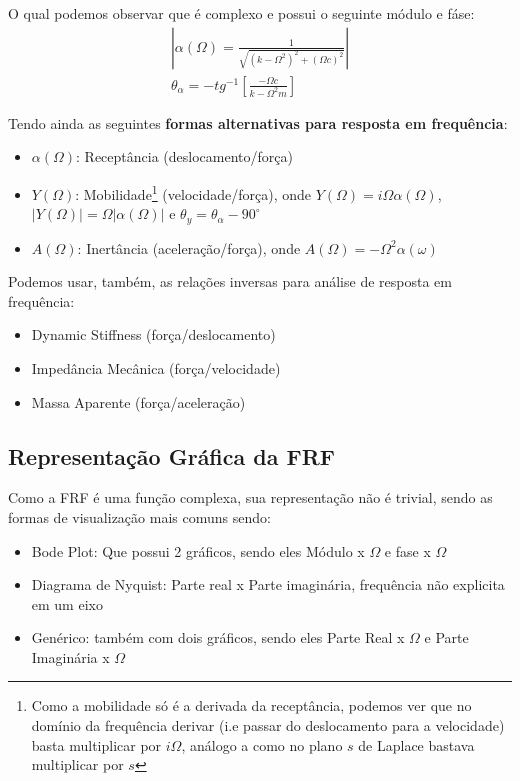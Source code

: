 \documentclass{article}
\begin{document}
O qual podemos observar que é complexo e possui o seguinte módulo e fáse:
\begin{align}
    |\alpha(\Omega) = \frac{1}{\sqrt{(k - \Omega^2)^2 + (\Omega c)^2}}| \\
    \theta_\alpha = -tg^{-1} \left[\frac{-\Omega c}{k - \Omega^2 m}\right]
\end{align}

Tendo ainda as seguintes \textbf{formas alternativas para resposta em frequência}:
\begin{itemize}
    \item $\alpha(\Omega)$: Receptância (deslocamento/força)
    \item $Y(\Omega)$: Mobilidade\footnote{Como a mobilidade só é a derivada da receptância, podemos ver que no domínio da frequência derivar (i.e passar do deslocamento para a velocidade) basta multiplicar por $i\Omega$, análogo a como no plano $s$ de Laplace bastava multiplicar por $s$} (velocidade/força), onde $Y(\Omega) = i \Omega \alpha(\Omega)$, $|Y(\Omega)| = \Omega |\alpha(\Omega)|$ e $\theta_y = \theta_\alpha - 90^\circ$
    \item $A(\Omega)$: Inertância (aceleração/força), onde $A(\Omega) = -\Omega^2 \alpha(\omega)$
\end{itemize}

Podemos usar, também, as relações inversas para análise de resposta em frequência:
\begin{itemize}
    \item Dynamic Stiffness (força/deslocamento)
    \item Impedância Mecânica (força/velocidade)
    \item Massa Aparente (força/aceleração)
\end{itemize}

\subsection{Representação Gráfica da FRF}
Como a FRF é uma função complexa, sua representação não é trivial, sendo as formas de visualização mais comuns sendo:
\begin{itemize}
    \item Bode Plot: Que possui 2 gráficos, sendo eles Módulo x $\Omega$ e fase x $\Omega$
    \item Diagrama de Nyquist: Parte real x Parte imaginária, frequência não explicita em um eixo
    \item Genérico: também com dois gráficos, sendo eles Parte Real x $\Omega$ e Parte Imaginária x $\Omega$
\end{itemize}
\end{document}
